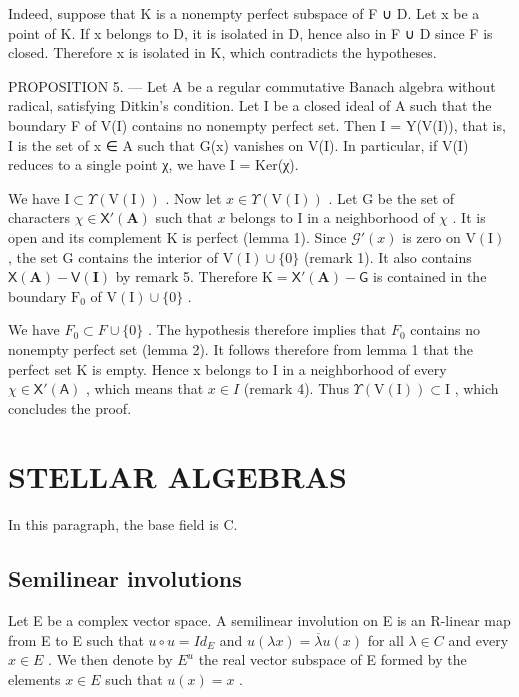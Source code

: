 Indeed, suppose that K is a nonempty perfect subspace of F ∪ D. Let x be a point of K. If x belongs to D, it is isolated in D, hence also in F ∪ D since F is closed. Therefore x is isolated in K, which contradicts the hypotheses.

PROPOSITION 5. — Let A be a regular commutative Banach algebra without radical, satisfying Ditkin's condition. Let I be a closed ideal of A such that the boundary F of V(I) contains no nonempty perfect set. Then I = Y(V(I)), that is, I is the set of x ∈ A such that G(x) vanishes on V(I). In particular, if V(I) reduces to a single point χ, we have I = Ker(χ).

We have \(\mathrm{I} \subset \Upsilon(\mathrm{V}(\mathrm{I}))\) . Now let \(x \in \Upsilon(\mathrm{V}(\mathrm{I}))\) . Let \(\mathrm{G}\) be the set of characters \(\chi \in \mathsf{X}'(\mathbf{A})\) such that \(x\) belongs to \(\mathrm{I}\) in a neighborhood of \(\chi\) . It is open and its complement \(\mathrm{K}\) is perfect (lemma 1). Since \(\mathcal{G}'(x)\) is zero on \(\mathrm{V}(\mathrm{I})\) , the set \(\mathrm{G}\) contains the interior of \(\mathrm{V}(\mathrm{I}) \cup \{0\}\) (remark 1). It also contains \(\mathsf{X}(\mathbf{A}) - \mathsf{V}(\mathbf{I})\) by remark 5. Therefore \(\mathrm{K} = \mathsf{X}'(\mathbf{A}) - \mathsf{G}\) is contained in the boundary \(\mathrm{F}_0\) of \(\mathrm{V}(\mathrm{I}) \cup \{0\}\) .

We have \(F_{0} \subset F \cup \{0\}\) . The hypothesis therefore implies that \(F_{0}\) contains no nonempty perfect set (lemma 2). It follows therefore from lemma 1 that the perfect set K is empty. Hence x belongs to I in a neighborhood of every \(\chi \in \mathsf{X}'(\mathsf{A})\) , which means that \(x \in I\) (remark 4). Thus \(\Upsilon(\mathrm{V}(\mathrm{I})) \subset \mathrm{I}\) , which concludes the proof.

\section{STELLAR ALGEBRAS}

In this paragraph, the base field is C.

\subsection{Semilinear involutions}

Let E be a complex vector space. A semilinear involution on E is an R-linear map from E to E such that \(u \circ u = Id_{E}\) and \(u(\lambda x) = \overline{\lambda}u(x)\) for all \(\lambda \in C\) and every \(x \in E\) . We then denote by \(E^{u}\) the real vector subspace of E formed by the elements \(x \in E\) such that \(u(x) = x\) .

